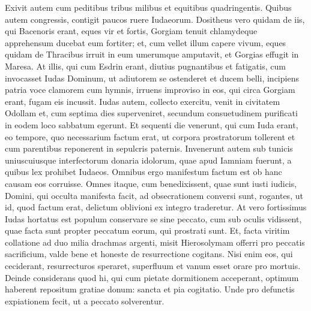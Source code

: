 \begin{biblechapter}
\verse Exivit autem cum peditibus tribus milibus et equitibus quadringentis. 
\verse Quibus autem congressis, contigit paucos ruere Iudaeorum.  
\verse Dositheus vero quidam de iis, qui Bacenoris erant, eques vir et fortis, Gorgiam tenuit chlamydeque apprehensum ducebat eum fortiter; et, cum vellet illum capere vivum, eques quidam de Thracibus irruit in eum umerumque amputavit, et Gorgias effugit in Maresa. 
\verse At illis, qui cum Esdrin erant, diutius pugnantibus et fatigatis, cum invocasset Iudas Dominum, ut adiutorem se ostenderet et ducem belli, 
\verse incipiens patria voce clamorem cum hymnis, irruens improviso in eos, qui circa Gorgiam erant, fugam eis incussit. 
\verse Iudas autem, collecto exercitu, venit in civitatem Odollam et, cum septima dies superveniret, secundum consuetudinem purificati in eodem loco sabbatum egerunt. 
\verse Et sequenti die venerunt, qui cum Iuda erant, eo tempore, quo necessarium factum erat, ut corpora prostratorum tollerent et cum parentibus reponerent in sepulcris paternis. 
\verse Invenerunt autem sub tunicis uniuscuiusque interfectorum donaria idolorum, quae apud Iamniam fuerunt, a quibus lex prohibet Iudaeos. Omnibus ergo manifestum factum est ob hanc causam eos corruisse. 
\verse Omnes itaque, cum benedixissent, quae sunt iusti iudicis, Domini, qui occulta manifesta facit, 
\verse ad obsecrationem conversi sunt, rogantes, ut id, quod factum erat, delictum oblivioni ex integro traderetur. At vero fortissimus Iudas hortatus est populum conservare se sine peccato, cum sub oculis vidissent, quae facta sunt propter peccatum eorum, qui prostrati sunt. 
\verse Et, facta viritim collatione ad duo milia drachmas argenti, misit Hierosolymam offerri pro peccatis sacrificium, valde bene et honeste de resurrectione cogitans. 
\verse Nisi enim eos, qui ceciderant, resurrecturos speraret, superfluum et vanum esset orare pro mortuis. 
\verse Deinde considerans quod hi, qui cum pietate dormitionem acceperant, optimum haberent repositum gratiae donum: 
\verse sancta et pia cogitatio. Unde pro defunctis expiationem fecit, ut a peccato solverentur. 
\end{biblechapter}

